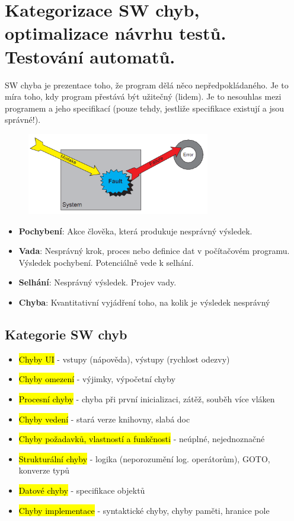 \section[TVS - Chyby,optimalizace testů,test. automatů]{Kategorizace SW chyb, optimalizace návrhu testů. Testování automatů.}

SW chyba je prezentace toho, že program dělá něco nepředpokládaného. Je to míra toho, kdy program přestává být užitečný (lidem). Je to nesouhlas mezi programem a jeho specifikací (pouze tehdy, jestliže specifikace existují a jsou správné!).

\begin{figure}[h!]
\centering
\includegraphics[width=80mm]{13/images/chyba}
\end{figure}

\begin{itemize}[itemsep=0px]
\item \textbf{Pochybení}: Akce člověka, která produkuje nesprávný výsledek.
\item \textbf{Vada}: Nesprávný krok, proces nebo definice dat v počítačovém programu. Výsledek pochybení. Potenciálně vede k selhání.
\item \textbf{Selhání}: Nesprávný výsledek. Projev vady.
\item \textbf{Chyba}: Kvantitativní vyjádření toho, na kolik je výsledek nesprávný
\end{itemize}

\subsection{Kategorie SW chyb}

\begin{itemize}[itemsep=0px]
\item \hl{Chyby UI} - vstupy (nápověda), výstupy (rychlost odezvy)
\item \hl{Chyby omezení} - výjimky, výpočetní chyby
\item \hl{Procesní chyby} - chyba při první inicializaci, zátěž, souběh více vláken
\item \hl{Chyby vedení} - stará verze knihovny, slabá doc
\item \hl{Chyby požadavků, vlastností a funkčnosti} - neúplné, nejednoznačné
\item \hl{Strukturální chyby} - logika (neporozumění log. operátorům), GOTO, konverze typů
\item \hl{Datové chyby} - specifikace objektů
\item \hl{Chyby implementace} - syntaktické chyby, chyby paměti, hranice pole
\end{itemize}
